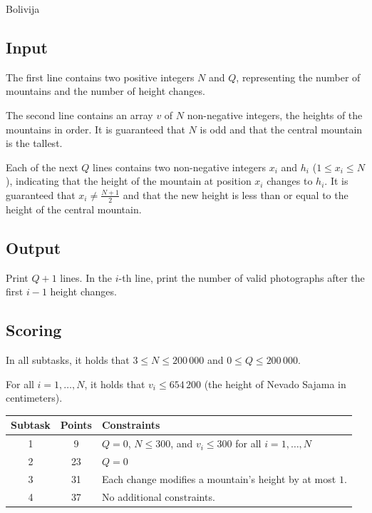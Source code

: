 \begin{statement}[
  problempoints=100,
  timelimit=2 seconds,
  memorylimit=512 MiB,
]{Bolivija}
\subsection*{Input}

The first line contains two positive integers $N$ and $Q$, representing 
the number of mountains and the number of height changes.

The second line contains an array $v$ of $N$ non-negative integers, 
the heights of the mountains in order.  
It is guaranteed that $N$ is odd and that the central mountain is the tallest.

Each of the next $Q$ lines contains two non-negative integers $x_i$ and $h_i$ ($1 \leq x_i \leq N$), 
indicating that the height of the mountain at position $x_i$ changes to $h_i$.  
It is guaranteed that $x_i \neq \frac{N+1}{2}$ and that the new height is less than or equal to 
the height of the central mountain.

\subsection*{Output}

Print $Q + 1$ lines.  
In the $i$-th line, print the number of valid photographs after the first $i-1$ height changes.

\subsection*{Scoring}

In all subtasks, it holds that $3 \leq N \leq 200\,000$ and $0 \leq Q \leq 200\,000$.

For all $i = 1, \dots, N$, it holds that $v_i \leq 654\,200$ 
(the height of Nevado Sajama in centimeters).

{\renewcommand{\arraystretch}{1.4}
  \setlength{\tabcolsep}{6pt}
  \begin{tabular}{ccl}
   Subtask & Points & Constraints \\ \midrule
    1 & 9 & $Q = 0$, $N \leq 300$, and $v_i \leq 300$ for all $i = 1, \dots, N$ \\
    2 & 23 & $Q = 0$ \\
    3 & 31 & Each change modifies a mountain's height by at most $1$. \\
    4 & 37 & No additional constraints. \\
\end{tabular}}


\end{statement}
